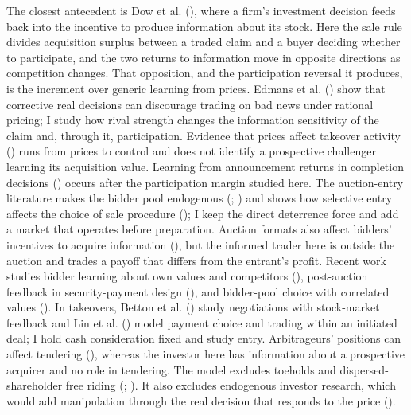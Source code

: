 \documentclass[
  12pt,
]{article}
\begin{document}
The closest antecedent is Dow et al.
(), where a firm's
investment decision feeds back into the incentive to produce information
about its stock. Here the sale rule divides acquisition surplus between
a traded claim and a buyer deciding whether to participate, and the two
returns to information move in opposite directions as competition
changes. That opposition, and the participation reversal it produces, is
the increment over generic learning from prices. Edmans et al.
() show that corrective
real decisions can discourage trading on bad news under rational
pricing; I study how rival strength changes the information sensitivity
of the claim and, through it, participation. Evidence that prices affect
takeover activity () runs from prices to control and does not identify a prospective
challenger learning its acquisition value. Learning from announcement
returns in completion decisions ()
occurs after the participation margin studied here. The auction-entry
literature makes the bidder pool endogenous
(;
) and shows how
selective entry affects the choice of sale procedure
(); I keep
the direct deterrence force and add a market that operates before
preparation. Auction formats also affect bidders' incentives to acquire
information (), but the informed
trader here is outside the auction and trades a payoff that differs from
the entrant's profit. Recent work studies bidder learning about own
values and competitors (), post-auction feedback in security-payment design
(), and
bidder-pool choice with correlated values
(). In takeovers,
Betton et al. () study negotiations
with stock-market feedback and Lin et al.
() model payment choice and trading
within an initiated deal; I hold cash consideration fixed and study
entry. Arbitrageurs' positions can affect tendering
(), whereas the
investor here has information about a prospective acquirer and no role
in tendering. The model excludes toeholds and dispersed-shareholder free
riding (;
). It also
excludes endogenous investor research, which would add manipulation
through the real decision that responds to the price
().
\end{document}
